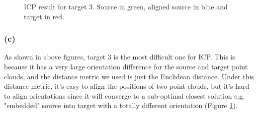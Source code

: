 \documentclass{article}
\theoremstyle{definition} %
\begin{document}
\begin{figure}[H]
    \centering
    \quad
    \caption{ICP result for target 3. Source in green, aligned source in blue and target in red.}
    \label{fig:icp_tgt_3}
\end{figure}

\subsubsection*{(c)}
As shown in above figures, target 3 is the most difficult one for ICP. This is because it has a very large orientation difference for the source and target point clouds, and the distance metric we used is just the Euclidean distance. Under this distance metric, it's easy to align the positions of two point clouds, but it's hard to align orientations since it will converge to a sub-optimal closest solution e.g. "embedded" source into target with a totally different orientation (Figure \ref{fig:icp_tgt_3}).
\end{document}
